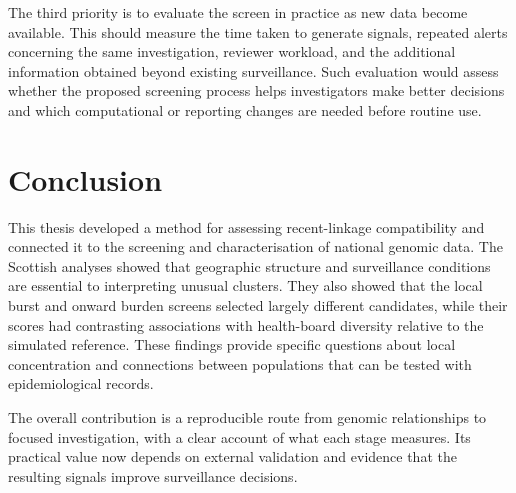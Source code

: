The third priority is to evaluate the screen in practice as new data become available. This should measure the time taken to generate signals, repeated alerts concerning the same investigation, reviewer workload, and the additional information obtained beyond existing surveillance. Such evaluation would assess whether the proposed screening process helps investigators make better decisions and which computational or reporting changes are needed before routine use.

\section{Conclusion}\label{sec:ch7_conclusion}

This thesis developed a method for assessing recent-linkage compatibility and connected it to the screening and characterisation of national genomic data. The Scottish analyses showed that geographic structure and surveillance conditions are essential to interpreting unusual clusters. They also showed that the local burst and onward burden screens selected largely different candidates, while their scores had contrasting associations with health-board diversity relative to the simulated reference. These findings provide specific questions about local concentration and connections between populations that can be tested with epidemiological records.

The overall contribution is a reproducible route from genomic relationships to focused investigation, with a clear account of what each stage measures. Its practical value now depends on external validation and evidence that the resulting signals improve surveillance decisions.
